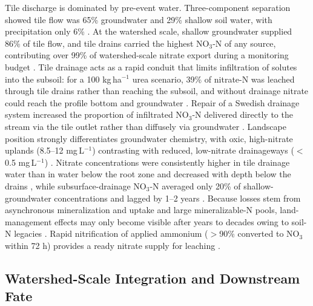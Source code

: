 Tile discharge is dominated by pre-event water. Three-component separation showed tile flow was 65\% groundwater and 29\% shallow soil water, with precipitation only 6\% \parencite{Williams2022}. At the watershed scale, shallow groundwater supplied 86\% of tile flow, and tile drains carried the highest NO$_3$-N of any source, contributing over 99\% of watershed-scale nitrate export during a monitoring budget \parencite{Grose2022}. Tile drainage acts as a rapid conduit that limits infiltration of solutes into the subsoil: for a 100 kg\,ha$^{-1}$ urea scenario, 39\% of nitrate-N was leached through tile drains rather than reaching the subsoil, and without drainage nitrate could reach the profile bottom and groundwater \parencite{Filipovic2015}. Repair of a Swedish drainage system increased the proportion of infiltrated NO$_3$-N delivered directly to the stream via the tile outlet rather than diffusely via groundwater \parencite{Wesström2015}. Landscape position strongly differentiates groundwater chemistry, with oxic, high-nitrate uplands (8.5--12 mg\,L$^{-1}$) contrasting with reduced, low-nitrate drainageways ($<$0.5 mg\,L$^{-1}$) \parencite{Schilling2007}. Nitrate concentrations were consistently higher in tile drainage water than in water below the root zone and decreased with depth below the drains \parencite{Randall2000}, while subsurface-drainage NO$_3$-N averaged only 20\% of shallow-groundwater concentrations and lagged by 1--2 years \parencite{Derby2009}. Because losses stem from asynchronous mineralization and uptake and large mineralizable-N pools, land-management effects may only become visible after years to decades owing to soil-N legacies \parencite{Cambardella1999,Bauwe2020}. Rapid nitrification of applied ammonium ($>$90\% converted to NO$_3$ within 72 h) provides a ready nitrate supply for leaching \parencite{Hu2024}.

\subsection{Watershed-Scale Integration and Downstream Fate}

